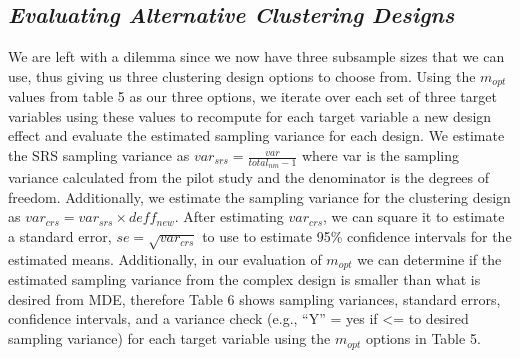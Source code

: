 \documentclass[
  12pt]{article}
\begin{document}
\subsection{\texorpdfstring{\emph{Evaluating Alternative Clustering
Designs}}{Evaluating Alternative Clustering Designs}}\label{evaluating-alternative-clustering-designs}

We are left with a dilemma since we now have three subsample sizes that
we can use, thus giving us three clustering design options to choose
from. Using the \(m_{opt}\) values from table 5 as our three options, we
iterate over each set of three target variables using these values to
recompute for each target variable a new design effect and evaluate the
estimated sampling variance for each design. We estimate the SRS
sampling variance as \(var_{srs} = \frac{var}{total_{nm} - 1}\) where
var is the sampling variance calculated from the pilot study and the
denominator is the degrees of freedom. Additionally, we estimate the
sampling variance for the clustering design as
\(var_{crs} = var_{srs} \times deff_{new}\). After estimating
\(var_{crs}\), we can square it to estimate a standard error,
\(se=\sqrt{var_{crs}}\) to use to estimate 95\% confidence intervals for
the estimated means. Additionally, in our evaluation of \(m_{opt}\) we
can determine if the estimated sampling variance from the complex design
is smaller than what is desired from MDE, therefore Table 6 shows
sampling variances, standard errors, confidence intervals, and a
variance check (e.g., ``Y'' = yes if \textless= to desired sampling
variance) for each target variable using the \(m_{opt}\) options in
Table 5.
\end{document}
